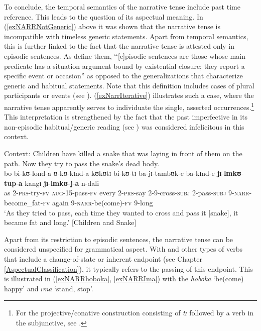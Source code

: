 \label{Episodic}
To conclude, the temporal semantics of the narrative tense include past time reference. This leads to the question of its aspectual meaning. In (\ref{exNARRNotGeneric}) above it was shown that the narrative tense is incompatible with timeless generic statements. Apart from temporal semantics, this is further linked to the fact that the narrative tense is attested only in episodic sentences. As \citet[36]{KrifkaMetal1995} define them, \lq\lq [e]pisodic sentences are those whose main predicate has a situation argument bound by existential closure; they report a specific event or occasion'' as opposed to the generalizations that characterize generic and habitual statements. Note that this definition includes cases of plural participants or events (see \citealt{CarlsonG2009}). (\ref{exNarrIterative}) illustrates such a case, where the narrative tense apparently serves to individuate the single, asserted occurrences.\footnote{For the projective/conative construction consisting of \textit{tɪ} followed by a verb in the subjunctive, see .} This interpretation is strengthened by the fact that the past imperfective in its non-episodic habitual/generic reading (see ) was considered infelicitous in this context.
\begin{exe}
\ex Context: Children have killed a snake that was laying in front of them on the path. Now they try to pass the snake's dead body. \label{exNarrIterative} \\
\gll bo bi-kʊ-lond-a ʊ-kʊ-kɪnd-a kʊkʊtɪ bi-kʊ-tɪ ba-jɪ-tambʊk-e ba-kɪnd-e \textbf{jɪ}-\textbf{lɪnkʊ}-\textbf{tup}-\textbf{a} kangɪ \textbf{jɪ}-\textbf{lɪnkʊ}-\textbf{j}-\textbf{a} n-dali\\
as 2-\textsc{prs}-try-\textsc{fv} \textsc{aug}-15-pass-\textsc{fv} every 2-\textsc{prs}-say 2-9-cross-\textsc{subj} 2-pass-\textsc{subj} 9-\textsc{narr}-become\_fat-\textsc{fv} again 9-\textsc{narr}-be(come)-\textsc{fv} 9-long\\
\glt \lq As they tried to pass, each time they wanted to cross and pass it [snake], it became fat and long.' [Children and Snake]
\end{exe}

Apart from its restriction to episodic sentences, the narrative tense can be considered unspecified for grammatical aspect. With  and other types of verbs that include a change-of-state or inherent endpoint (see Chapter \ref{AspectualClassification}), it typically refers to the passing of this endpoint. This is illustrated in (\ref{exNARRhoboka}, \ref{exNARRIma}) with the  \textit{hoboka} \lq be(come) happy' and \textit{ɪma} \lq stand, stop'.


